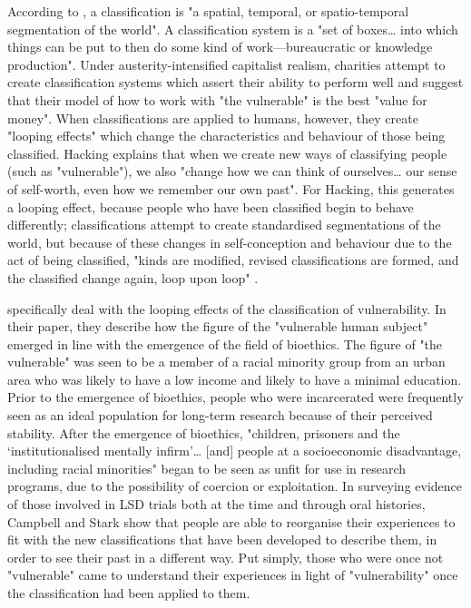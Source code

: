 According to \citet[p. 110]{bowker_sorting_1999}, a classification is "a spatial, temporal, or spatio-temporal segmentation of the world". A classification system is a "set of boxes\ldots{} into which things can be put to then do some kind of work—bureaucratic or knowledge production". Under austerity-intensified capitalist realism, charities attempt to create classification systems which assert their ability to perform well and suggest that their model of how to work with "the vulnerable" is the best "value for money". When  classifications are applied to humans, however, they create "looping effects" \citep{hacking_looping_1996} which change the characteristics and behaviour of those being classified. Hacking  explains that when we create new ways of classifying people (such as "vulnerable"), we also "change how we can think of ourselves\ldots{} our sense of self-worth, even how we remember our own past". For Hacking, this generates a looping effect, because people who have been classified begin to behave differently; classifications attempt to create standardised segmentations of the world, but because of these changes in self-conception and behaviour due to the act of being classified, "kinds are modified, revised classifications are formed, and the classified change again, loop upon loop" \citep[p. 370]{hacking_looping_1996}.

\citet{campbell_making_2015} specifically deal with the looping effects of the classification of vulnerability. In their paper, they describe how the figure of the "vulnerable human subject" emerged in line with the
emergence of the field of bioethics. The figure of "the vulnerable" was seen to be a member of a racial minority group from an urban area who was likely to have a low income and likely to have a minimal education. Prior to the emergence of bioethics, people who were incarcerated were frequently seen as an ideal population for long-term research because of their perceived stability. After the emergence of bioethics, "children, prisoners and the `institutionalised mentally infirm'\ldots{} [and] people at a socioeconomic disadvantage, including racial minorities" \citep[p. 16]{campbell_making_2015} began to be seen as unfit for use in research programs, due to the possibility of coercion or exploitation. In surveying evidence of those involved in LSD trials both at the time and through oral histories, Campbell and Stark show that people are able to reorganise their experiences to fit with the new classifications that have been developed to describe them, in order to see their past in a different way. Put simply, those who were once not "vulnerable" came to understand their experiences in light of "vulnerability" once the classification had been applied to them.

